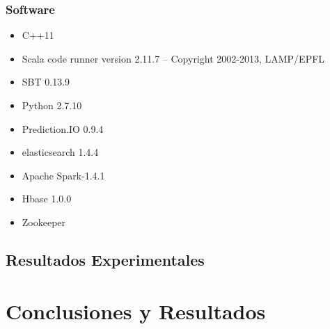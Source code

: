 \subsubsection{Software}

\begin{itemize}
	\item C++11
	\item Scala code runner version 2.11.7 -- Copyright 2002-2013, LAMP/EPFL
	\item SBT 0.13.9 
	\item Python 2.7.10
	\item Prediction.IO 0.9.4
	\item elasticsearch 1.4.4	
	\item Apache Spark-1.4.1
	\item Hbase 1.0.0
	\item Zookeeper 

\end{itemize}





\subsection{Resultados Experimentales}


\section{Conclusiones y Resultados}





 
 
 




 


